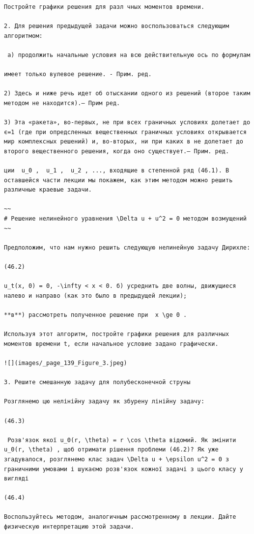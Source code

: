 \documentclass[
  ukrainian,
]{article}
\begin{document}
\begin{verbatim}
Постройте графики решения для разл чных моментов времени.

2. Для решения предыдущей задачи можно воспользоваться следующим алгоритмом:

 а) продолжить начальные условия на всю действительную ось по формулам

имеет только вулевое решение. - Прим. ред.

2) Здесь и ниже речь идет об отыскании одного из решений (второе таким методом не находится).— Прим ред.

3) Эта «ракета», во-первых, не при всех граничных условиях долетает до є=1 (где при опредсленных вещественных граничных условиях открывается мир комплексных решений) и, во-вторых, ни при каких в не долетает до второго вещественного решения, когда оно существует.— Прим. ред.

ции  u_0 ,  u_1 ,  u_2 , ..., входящие в степенной ряд (46.1). В оставшейся части лекции мы покажем, как этим методом можно решить различные краевые задачи.

~~
# Решение нелинейного уравнения \Delta u + u^2 = 0 методом возмущений
~~

Предположим, что нам нужно решить следующую нелинейную задачу Дирихле:

(46.2)

u_t(x, 0) = 0, -\infty < x < 0. б) усреднить две волны, движущиеся налево и направо (как это было в предыдущей лекции);

**в**) рассмотреть полученное решение при  x \ge 0 .

Используя этот алгоритм, постройте графики решения для различных моментов времени t, если начальное условие задано графически.

![](images/_page_139_Figure_3.jpeg)

3. Решите смешанную задачу для полубесконечной струны

Розглянемо цю нелінійну задачу як збурену лінійну задачу:

(46.3)

 Розв'язок якої u_0(r, \theta) = r \cos \theta відомий. Як змінити u_0(r, \theta) , щоб отримати рішення проблеми (46.2)? Як уже згадувалося, розглянемо клас задач \Delta u + \epsilon u^2 = 0 з граничними умовами і шукаємо розв'язок кожної задачі з цього класу у вигляді

(46.4)

Воспользуйтесь методом, аналогичным рассмотренному в лекции. Дайте физическую интерпретацию этой задачи.


\end{verbatim}
\end{document}
